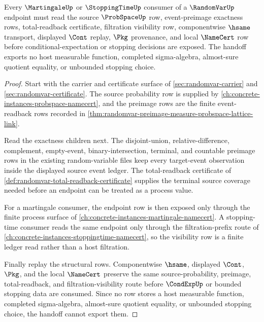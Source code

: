 \begin{theorem}
\label{thm:randomvar-martingale-filtration-handoff}
Every $\MartingaleUp$ or $\StoppingTimeUp$ consumer of a $\RandomVarUp$ endpoint must read the source $\ProbSpaceUp$ row, event-preimage exactness rows, total-readback certificate, filtration visibility row, componentwise $\hsame$ transport, displayed $\Cont$ replay, $\Pkg$ provenance, and local $\NameCert$ row before conditional-expectation or stopping decisions are exposed. The handoff exports no host measurable function, completed sigma-algebra, almost-sure quotient equality, or unbounded stopping choice.
\end{theorem}
\begin{proof}
Start with the carrier and certificate surface of \autoref{sec:randomvar-carrier} and \autoref{sec:randomvar-certificate}. The source probability row is supplied by \autoref{ch:concrete-instances-probspace-namecert}, and the preimage rows are the finite event-readback rows recorded in \autoref{thm:randomvar-preimage-measure-probspace-lattice-link}.

Read the exactness children next. The disjoint-union, relative-difference, complement, empty-event, binary-intersection, terminal, and countable preimage rows in the existing random-variable files keep every target-event observation inside the displayed source event ledger. The total-readback certificate of \autoref{def:randomvar-total-readback-certificate} supplies the terminal source coverage needed before an endpoint can be treated as a process value.

For a martingale consumer, the endpoint row is then exposed only through the finite process surface of \autoref{ch:concrete-instances-martingale-namecert}. A stopping-time consumer reads the same endpoint only through the filtration-prefix route of \autoref{ch:concrete-instances-stoppingtime-namecert}, so the visibility row is a finite ledger read rather than a host filtration.

Finally replay the structural rows. Componentwise $\hsame$, displayed $\Cont$, $\Pkg$, and the local $\NameCert$ preserve the same source-probability, preimage, total-readback, and filtration-visibility route before $\CondExpUp$ or bounded stopping data are consumed. Since no row stores a host measurable function, completed sigma-algebra, almost-sure quotient equality, or unbounded stopping choice, the handoff cannot export them.
\end{proof}
